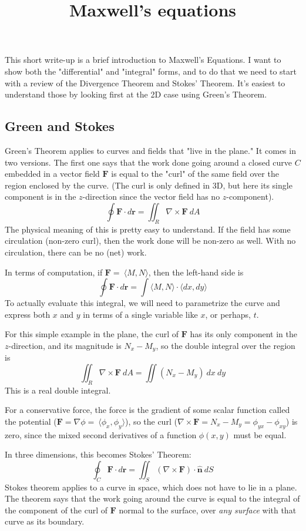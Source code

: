 \documentclass[11pt, oneside]{article}   	%
\title{Maxwell's equations}
\date{}							%
\begin{document}
\maketitle
\Large

This short write-up is a brief introduction to Maxwell's Equations.  I want to show both the "differential" and "integral" forms, and to do that we need to start with a review of the Divergence Theorem and Stokes' Theorem.  It's easiest to understand those by looking first at the 2D case using Green's Theorem.
\subsection*{Green and Stokes}
Green's Theorem applies to curves and fields that "live in the plane."  It comes in two versions.  The first one says that the work done going around a closed curve $C$ embedded in a vector field $\mathbf{F}$ is equal to the "curl" of the same field over the region enclosed by the curve.  (The curl is only defined in 3D, but here its single component is in the $z$-direction since the vector field has no $z$-component).
\[ \oint \mathbf{F} \cdot d \mathbf{r} = \iint_R \nabla \times \mathbf{F} \ dA \]
The physical meaning of this is pretty easy to understand.  If the field has some circulation (non-zero curl), then the work done will be non-zero as well.  With no circulation, there can be no (net) work.

In terms of computation, if $\mathbf{F} = \ \langle M, N \rangle$, then the left-hand side is 
\[ \oint \mathbf{F} \cdot d \mathbf{r} = \int \langle M, N \rangle \cdot \langle dx, dy \rangle \]
To actually evaluate this integral, we will need to parametrize the curve and express both $x$ and $y$ in terms of a single variable like $x$, or perhaps, $t$.

For this simple example in the plane, the curl of $\mathbf{F}$ has its only component in the $z$-direction, and its magnitude is $N_x - M_y$, so the double integral over the region is
\[ \iint_R \nabla \times \mathbf{F} \ dA = \iint (N_x - M_y) \ dx \ dy \]
This is a real double integral.

For a conservative force, the force is the gradient of some scalar function called the potential ($\mathbf{F} = \nabla \phi = \ \langle \phi_x, \phi_y \rangle$), so the curl ($\nabla \times \mathbf{F} = N_x - M_y = \phi_{yx} - \phi_{xy}$) is zero, since the mixed second derivatives of a function $\phi(x,y)$ must be equal.

In three dimensions, this becomes Stokes' Theorem:
\[ \oint_C \mathbf{F} \cdot d \mathbf{r} = \iint_S ( \nabla \times \mathbf{F}) \cdot \hat{\mathbf{n}} \ dS \]
Stokes theorem applies to a curve in space, which does not have to lie in a plane.  The theorem says that the work going around the curve is equal to the integral of the component of the curl of $\mathbf{F}$ normal to the surface, over \emph{any surface} with that curve as its boundary. 
\end{document}
